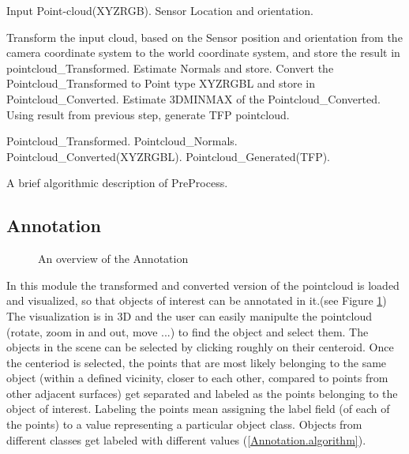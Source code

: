 \begin{algorithm}[t]
\begin{algorithmic}[1]
\REQUIRE Input Point-cloud(XYZRGB).
\REQUIRE Sensor Location and orientation.
\medskip

\STATE Transform the input cloud, based on the Sensor position and orientation from the camera coordinate system to the world coordinate system, and store the result in pointcloud\_Transformed.
\STATE Estimate Normals and store.
\STATE Convert the Pointcloud\_Transformed to Point type XYZRGBL and store in Pointcloud\_Converted.
\STATE Estimate 3DMINMAX of the Pointcloud\_Converted.
\STATE Using result from previous step, generate TFP pointcloud.

\medskip
\ENSURE Pointcloud\_Transformed.
\ENSURE Pointcloud\_Normals.
\ENSURE Pointcloud\_Converted(XYZRGBL).
\ENSURE Pointcloud\_Generated(TFP).

\end{algorithmic}
\caption[PreProcess.]
{A brief algorithmic description of PreProcess.}
\label{Preprocess.algorithm}
\end{algorithm}



 
 
\subsection{Annotation}
\label{Annotation.ssec}

\begin{figure}[t]
  \caption[Annotation overview]
  {An overview of the Annotation}
  \label{AnnotationFlowchart.figure}
\end{figure}


In this module the transformed and converted version of the pointcloud is loaded and visualized, so that objects of interest can be annotated in it.(see Figure \ref{AnnotationFlowchart.figure}) The visualization is in 3D and the user can easily manipulte the pointcloud (rotate, zoom in and out, move ...) to find the object and select them. 
The objects in the scene can be selected by clicking roughly on their centeroid. Once the centeriod is selected, the points that are most likely belonging to the same object (within a defined vicinity, closer to each other, compared to points from other adjacent surfaces) get separated and labeled as the points belonging to the object of interest. Labeling the points mean assigning the label field (of each of the points) to a value representing a particular object class. 
Objects from different classes get labeled with different values (\ref{Annotation.algorithm}).

